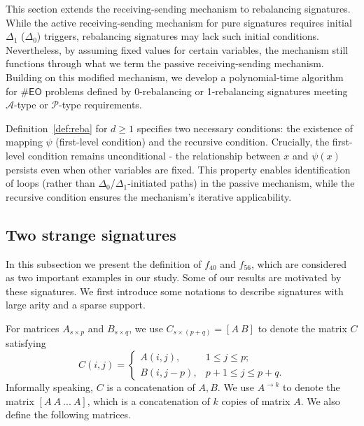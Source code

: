 \documentclass[a4paper,UKenglish,cleveref, autoref, thm-restate]{lipics-v2021}
\newcommand{\eo}[0]{\textsf{EO}}
\newcommand{\ba}[1][0]{{{#1}-rebalancing}}
\begin{document}
This section extends the receiving-sending mechanism to rebalancing signatures. While the active receiving-sending mechanism for pure signatures requires initial $\Delta_1$ ($\Delta_0$) triggers, rebalancing signatures may lack such initial conditions. Nevertheless, by assuming fixed values for certain variables, the mechanism still functions through what we term the passive receiving-sending mechanism. Building on this modified mechanism, we develop a polynomial-time algorithm for $\#\eo$ problems defined by \ba[0] or \ba[1] signatures meeting $\mathscr{A}$-type or $\mathscr{P}$-type requirements.

Definition~\ref{def:reba} for $d\ge 1$ specifies two necessary conditions: the existence of mapping $\psi$ (first-level condition) and the recursive condition. Crucially, the first-level condition remains unconditional - the relationship between $x$ and $\psi(x)$ persists even when other variables are fixed. This property enables identification of loops (rather than $\Delta_0$/$\Delta_1$-initiated paths) in the passive mechanism, while the recursive condition ensures the mechanism's iterative applicability.
 
    
\subsection{Two strange signatures}\label{4056}

In this subsection we present the definition of $f_{40}$ and $f_{56}$, which are considered as two important examples in our study. Some of our results are motivated by these signatures. We first introduce some notations to describe signatures with large arity and a sparse support.

For matrices $A_{s\times p}$ and $B_{s\times q}$, we use $C_{s\times (p+q)}=[A\ B]$ to denote the matrix $C$  satisfying 
\begin{equation}
    C(i,j)=\begin{cases}
        A(i,j),& 1\le j\le p;\\
        B(i,j-p),& p+1\le j\le p+q.
    \end{cases}
\end{equation}
Informally speaking, $C$ is a concatenation of $A,B$.
We use $A^{\to k}$ to denote the matrix $[A\  A\ ...\ A]$, which is a concatenation of $k$ copies of matrix $A$. We also define the following matrices.
\end{document}
